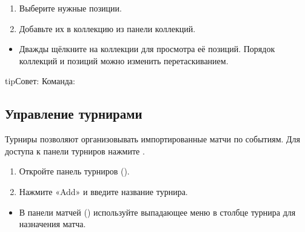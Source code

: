 \documentclass[letterpaper,10pt,russian]{sphinxmanual}
\begin{document}
\sphinxAtStartPar
{}
\begin{enumerate}
%
\item {} 
\sphinxAtStartPar
Выберите нужные позиции.

\item {} 
\sphinxAtStartPar
Добавьте их в коллекцию из панели коллекций.

\end{enumerate}

\sphinxAtStartPar
{}
\begin{itemize}
\item {} 
\sphinxAtStartPar
Дважды щёлкните на коллекции для просмотра её позиций. Порядок коллекций и позиций можно изменить перетаскиванием.

\end{itemize}

\begin{sphinxadmonition}{tip}{Совет:}
\sphinxAtStartPar
Команда: 
\end{sphinxadmonition}


\subsection{Управление турнирами}
\label{\detokenize{guide_utilisateur:gerer-les-tournois}}
\sphinxAtStartPar
Турниры позволяют организовывать импортированные матчи по событиям. Для доступа к панели турниров нажмите .

\sphinxAtStartPar
{}
\begin{enumerate}
%
\item {} 
\sphinxAtStartPar
Откройте панель турниров ().

\item {} 
\sphinxAtStartPar
Нажмите «Add» и введите название турнира.

\end{enumerate}

\sphinxAtStartPar
{}
\begin{itemize}
\item {} 
\sphinxAtStartPar
В панели матчей () используйте выпадающее меню в столбце турнира для назначения матча.

\end{itemize}
\end{document}
